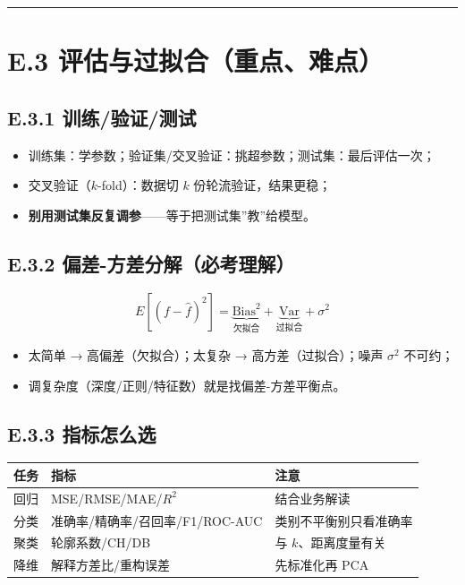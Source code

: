 \begin{center}\rule{0.5\linewidth}{0.5pt}\end{center}

\section{E.3
评估与过拟合（重点、难点）}\label{e.3-ux8bc4ux4f30ux4e0eux8fc7ux62dfux5408ux91cdux70b9ux96beux70b9}

\subsection{E.3.1
训练/验证/测试}\label{e.3.1-ux8badux7ec3ux9a8cux8bc1ux6d4bux8bd5}

\begin{itemize}
\tightlist
\item
  训练集：学参数；验证集/交叉验证：挑超参数；测试集：最后评估一次；
\item
  交叉验证（\(k\)-fold）：数据切 \(k\) 份轮流验证，结果更稳；
\item
  \textbf{别用测试集反复调参}------等于把测试集''教''给模型。
\end{itemize}

\subsection{E.3.2
偏差-方差分解（必考理解）}\label{e.3.2-ux504fux5dee-ux65b9ux5deeux5206ux89e3ux5fc5ux8003ux7406ux89e3}

\[E[(f-\hat f)^2]=\underbrace{\mathrm{Bias}^2}_{\text{欠拟合}} + \underbrace{\mathrm{Var}}_{\text{过拟合}} + \sigma^2\]

\begin{itemize}
\tightlist
\item
  太简单 → 高偏差（欠拟合）；太复杂 → 高方差（过拟合）；噪声
  \(\sigma^2\) 不可约；
\item
  调复杂度（深度/正则/特征数）就是找偏差-方差平衡点。
\end{itemize}

\subsection{E.3.3
指标怎么选}\label{e.3.3-ux6307ux6807ux600eux4e48ux9009}

{\def\LTcaptype{none} %
\begin{longtable}[]{@{}lll@{}}
\toprule\noalign{}
任务 & 指标 & 注意 \\
\midrule\noalign{}
\endhead
\bottomrule\noalign{}
\endlastfoot
回归 & MSE/RMSE/MAE/\(R^2\) & 结合业务解读 \\
分类 & 准确率/精确率/召回率/F1/ROC-AUC & 类别不平衡别只看准确率 \\
聚类 & 轮廓系数/CH/DB & 与 \(k\)、距离度量有关 \\
降维 & 解释方差比/重构误差 & 先标准化再 PCA \\
\end{longtable}
}

